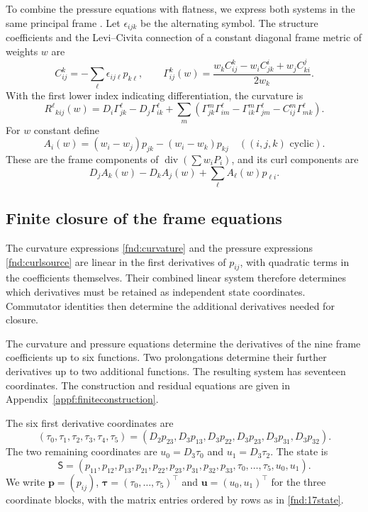 \documentclass[11pt,a4paper]{article}
\numberwithin{equation}{section}
\theoremstyle{plain}
\theoremstyle{definition}
\theoremstyle{remark}
\begin{document}
To combine the pressure equations with flatness, we express both systems
in the same principal frame \cite{Marris1982}. Let $\epsilon_{ijk}$ be the alternating
symbol. The structure coefficients and the Levi--Civita connection of
a constant diagonal frame metric of weights $w$ are
\begin{equation}\label{fnd:koszul}
C^k_{ij}=-\sum_\ell\epsilon_{ij\ell}p_{k\ell},\qquad
\Gamma^k_{ij}(w)=\frac{w_kC^k_{ij}-w_iC^i_{jk}+w_jC^j_{ki}}{2w_k}.
\end{equation}
With the first lower index indicating differentiation, the curvature is
\begin{equation}\label{fnd:curvature}
R^\ell{}_{kij}(w)=D_i\Gamma^\ell_{jk}-D_j\Gamma^\ell_{ik}
+\sum_m(\Gamma^m_{jk}\Gamma^\ell_{im}-\Gamma^m_{ik}\Gamma^\ell_{jm}-C^m_{ij}\Gamma^\ell_{mk}).
\end{equation}
For $w$ constant define
\[
A_i(w)=(w_i-w_j)p_{jk}-(w_i-w_k)p_{kj}\quad ((i,j,k)\text{ cyclic}).
\]
These are the frame components of $\operatorname{div}(\sum w_iP_i)$, and its curl components are
\begin{equation}\label{fnd:curlsource}
D_jA_k(w)-D_kA_j(w)+\sum_\ell A_\ell(w)p_{\ell i}.
\end{equation}

\subsection{Finite closure of the frame equations}

The curvature expressions \eqref{fnd:curvature} and the pressure
expressions \eqref{fnd:curlsource} are linear in the first derivatives
of $p_{ij}$, with quadratic terms in the coefficients themselves.
Their combined linear system therefore determines which derivatives
must be retained as independent state coordinates. Commutator
identities then determine the additional derivatives needed for closure.

The curvature and pressure equations determine the derivatives of the
nine frame coefficients up to six functions. Two prolongations determine
their further derivatives up to two additional functions. The resulting
system has seventeen coordinates. The construction and residual equations
are given in Appendix~\ref{appf:finiteconstruction}.

The six first derivative coordinates are
\begin{equation}\label{fnd:freejets}
(\tau_0,\tau_1,\tau_2,\tau_3,\tau_4,\tau_5)
=(D_2p_{23},D_3p_{13},D_3p_{22},D_3p_{23},D_3p_{31},D_3p_{32}).
\end{equation}
The two remaining coordinates are $u_0=D_3\tau_0$ and $u_1=D_3\tau_2$.
The state is
\begin{equation}\label{fnd:17state}
\mathsf S=(p_{11},p_{12},p_{13},p_{21},p_{22},p_{23},p_{31},p_{32},p_{33},\tau_0,\ldots,\tau_5,u_0,u_1).
\end{equation}
We write $\boldsymbol p=(p_{ij})$,
$\boldsymbol\tau=(\tau_0,\ldots,\tau_5)^{\top}$ and
$\boldsymbol u=(u_0,u_1)^{\top}$ for the three coordinate blocks,
with the matrix entries ordered by rows as in \eqref{fnd:17state}.
\end{document}
